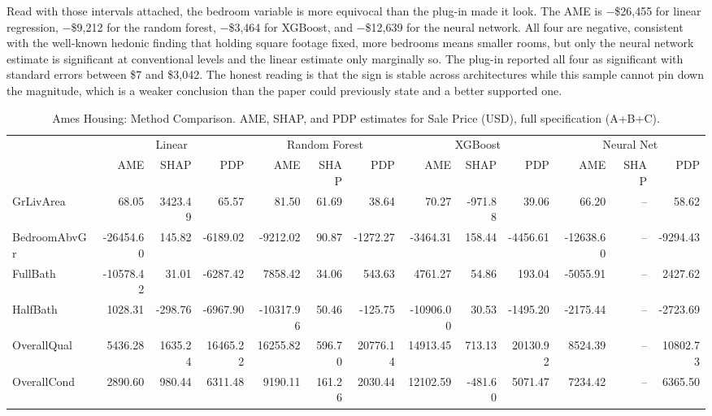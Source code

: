 \documentclass[12pt,a4paper]{article}
\numberwithin{equation}{section}
\theoremstyle{plain}
\theoremstyle{definition}
\begin{document}
	Read with those intervals attached, the bedroom variable is more equivocal than the plug-in made it look. The AME is $-$\$26,455 for linear regression, $-$\$9,212 for the random forest, $-$\$3,464 for XGBoost, and $-$\$12,639 for the neural network. All four are negative, consistent with the well-known hedonic finding that holding square footage fixed, more bedrooms means smaller rooms, but only the neural network estimate is significant at conventional levels and the linear estimate only marginally so. The plug-in reported all four as significant with standard errors between \$7 and \$3,042. The honest reading is that the sign is stable across architectures while this sample cannot pin down the magnitude, which is a weaker conclusion than the paper could previously state and a better supported one.
	
	\begin{table}
		\centering
		\small
		\begin{threeparttable}
			\caption{Ames Housing: Method Comparison. AME, SHAP, and PDP estimates for Sale Price (USD), full specification (A+B+C).}
			\label{tab:ames_housing_method_comparison}
			\begin{tabular}{lrrrrrrrrrrrr}
				\toprule
				& \multicolumn{3}{c}{Linear} & \multicolumn{3}{c}{Random Forest} & \multicolumn{3}{c}{XGBoost} & \multicolumn{3}{c}{Neural Net} \\
				\cmidrule(lr){2-4} \cmidrule(lr){5-7} \cmidrule(lr){8-10} \cmidrule(lr){11-13}
				& AME & SHAP & PDP & AME & SHAP & PDP & AME & SHAP & PDP & AME & SHAP & PDP \\
				\midrule
				GrLivArea & 68.05 & 3423.49 & 65.57 & 81.50 & 61.69 & 38.64 & 70.27 & -971.88 & 39.06 & 66.20 & -- & 58.62 \\
				BedroomAbvGr & -26454.60 & 145.82 & -6189.02 & -9212.02 & 90.87 & -1272.27 & -3464.31 & 158.44 & -4456.61 & -12638.60 & -- & -9294.43 \\
				FullBath & -10578.42 & 31.01 & -6287.42 & 7858.42 & 34.06 & 543.63 & 4761.27 & 54.86 & 193.04 & -5055.91 & -- & 2427.62 \\
				HalfBath & 1028.31 & -298.76 & -6967.90 & -10317.96 & 50.46 & -125.75 & -10906.00 & 30.53 & -1495.20 & -2175.44 & -- & -2723.69 \\
				\midrule
				OverallQual & 5436.28 & 1635.24 & 16465.22 & 16255.82 & 596.70 & 20776.14 & 14913.45 & 713.13 & 20130.92 & 8524.39 & -- & 10802.73 \\
				OverallCond & 2890.60 & 980.44 & 6311.48 & 9190.11 & 161.26 & 2030.44 & 12102.59 & -481.60 & 5071.47 & 7234.42 & -- & 6365.50 \\

\end{tabular}
\end{threeparttable}
\end{table}
\end{document}
